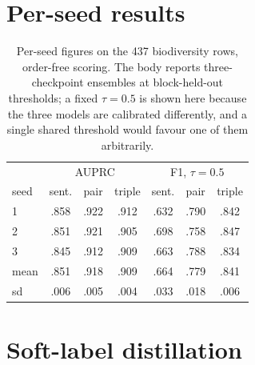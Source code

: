 \documentclass[11pt]{article}
\begin{document}



\appendix

\section{Per-seed results}
\label{app:seeds}

\begin{table}[t]\centering\footnotesize
\setlength{\tabcolsep}{2.2pt}
\begin{tabular}{lccc|ccc}
\toprule
 & \multicolumn{3}{c|}{AUPRC} & \multicolumn{3}{c}{F1, $\tau = 0.5$} \\
seed & sent. & pair & triple & sent. & pair & triple \\
\midrule
1 & .858 & .922 & .912 & .632 & .790 & .842 \\
2 & .851 & .921 & .905 & .698 & .758 & .847 \\
3 & .845 & .912 & .909 & .663 & .788 & .834 \\
\midrule
mean & .851 & .918 & .909 & .664 & .779 & .841 \\
sd   & .006 & .005 & .004 & .033 & .018 & .006 \\
\bottomrule
\end{tabular}
\caption{Per-seed figures on the 437 biodiversity rows, order-free scoring. The body reports
three-checkpoint ensembles at block-held-out thresholds; a fixed $\tau = 0.5$ is shown here because
the three models are calibrated differently, and a single shared threshold would favour one of them
arbitrarily.}
\label{tab:perseed}
\end{table}

\section{Soft-label distillation}
\label{app:soft}
\end{document}
